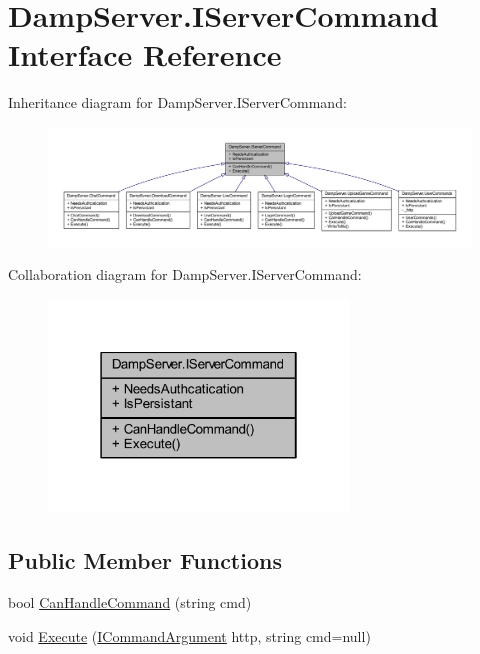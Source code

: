 \hypertarget{interface_damp_server_1_1_i_server_command}{\section{Damp\-Server.\-I\-Server\-Command Interface Reference}
\label{interface_damp_server_1_1_i_server_command}
}


Inheritance diagram for Damp\-Server.\-I\-Server\-Command\-:
\nopagebreak
\begin{figure}[H]
\begin{center}
\leavevmode
\includegraphics[width=350pt]{interface_damp_server_1_1_i_server_command__inherit__graph}
\end{center}
\end{figure}


Collaboration diagram for Damp\-Server.\-I\-Server\-Command\-:\nopagebreak
\begin{figure}[H]
\begin{center}
\leavevmode
\includegraphics[width=226pt]{interface_damp_server_1_1_i_server_command__coll__graph}
\end{center}
\end{figure}
\subsection*{Public Member Functions}
\begin{DoxyCompactItemize}
\item 
bool \hyperlink{interface_damp_server_1_1_i_server_command_a260322b35ee861d9b355476a78af56eb}{Can\-Handle\-Command} (string cmd)
\item 
void \hyperlink{interface_damp_server_1_1_i_server_command_a082eb85010846122c9d8413bc9231c00}{Execute} (\hyperlink{interface_damp_server_1_1_i_command_argument}{I\-Command\-Argument} http, string cmd=null)
\end{DoxyCompactItemize}
